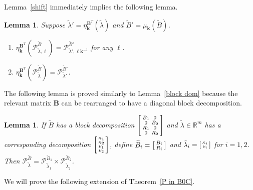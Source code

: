 \documentclass{amsart}
\newtheorem{lemma}[proposition]{Lemma}
\theoremstyle{definition}
\theoremstyle{remark}
\numberwithin{equation}{section}
\newcommand{\reals}{\mathbb R}
\newcommand{\0}{{\mathbf{0}}}
\newcommand{\kk}{{\boldsymbol{k}}}
\renewcommand{\ll}{{\boldsymbol\ell}}
\newcommand{\tB}{{\widetilde{B}}}
\newcommand{\BB}{\mathbf{B}}
\newcommand{\R}{\mathcal{R}}
\renewcommand{\P}{\mathcal{P}}
\begin{document}
Lemma~\ref{shift} immediately implies the following lemma.
\begin{lemma}\label{shift extended}
Suppose $\tilde\lambda'=\eta_\kk^{\BB^T}(\tilde\lambda)$ and $\tB'=\mu_\kk(\tB)$.
\begin{enumerate}[label=\bf\arabic*., ref=\arabic*]
\item \label{shift extended one}
$\eta^{\BB^T}_\kk\!\!(\P^\tB_{\tilde\lambda,\ll})=\P^{\tB'}_{\tilde\lambda',\ll\kk^{-1}}$ for any $\ll$.
\item \label{shift extended all}
  $\eta^{\BB^T}_\kk\!\!(\P^\tB_{\tilde\lambda})=\P^{\tB'}_{\tilde\lambda'}$.
\end{enumerate}
\end{lemma}

The following lemma is proved similarly to Lemma~\ref{block dom} because the relevant matrix $\BB$ can be rearranged to have a diagonal block decomposition.

\begin{lemma}\label{block dom ext}
If $\tB$ has a block decomposition $\begin{bsmallmatrix}B_1&0\\0&B_2\\R_1&0\\0&R_2\end{bsmallmatrix}$ and $\tilde\lambda\in\reals^m$ has a corresponding decomposition $\begin{bsmallmatrix}\kappa_1\\\kappa_2\\\nu_1\\\nu_2\end{bsmallmatrix}$, define $\tB_i=\begin{bsmallmatrix}B_i\\R_i\end{bsmallmatrix}$ and $\tilde\lambda_i=\begin{bsmallmatrix}\kappa_i\\\nu_i\end{bsmallmatrix}$ for $i=1,2$.
  Then $\P_{\tilde\lambda}^\tB=\P_{\tilde\lambda_1}^{\tB_1}\times\P_{\tilde\lambda_2}^{\tB_2}$.
\end{lemma}

We will prove the following extension of Theorem~\ref{P in B0C}.
\end{document}
